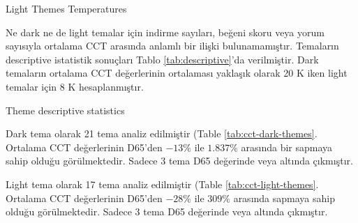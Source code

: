\documentclass{article}
\begin{document}
\begin{table}[H]

	\caption{Light Themes Temperatures}
  \label{tab:cct-light-themes}
\end{table}

Ne dark ne de light temalar için indirme sayıları, beğeni skoru veya yorum sayısıyla ortalama CCT arasında anlamlı bir
ilişki bulunamamıştır. Temaların descriptive istatistik sonuçları Tablo \ref{tab:descriptive}'da verilmiştir. Dark
temaların ortalama CCT değerlerinin ortalaması yaklaşık olarak 20 K iken light temalar için 8 K hesaplanmıştır. 

  
\begin{table}[H]

	\caption{Theme descriptive statistics}
	\label{tab:descriptive}
\end{table}

Dark tema olarak 21 tema analiz edilmiştir (Table \ref{tab:cct-dark-themes}. Ortalama CCT değerlerinin D65'den $-13\%$
ile $1.837\%$ arasında bir sapmaya sahip olduğu görülmektedir. Sadece 3 tema D65 değerinde veya altında çıkmıştır.

Light tema olarak 17 tema analiz edilmiştir (Table \ref{tab:cct-light-themes}. Ortalama CCT değerlerinin D65'den $-28\%$
ile $309\%$ arasında sapmaya sahip olduğu görülmektedir. Sadece 3 tema D65 değerinde veya altında çıkmıştır.
\end{document}
